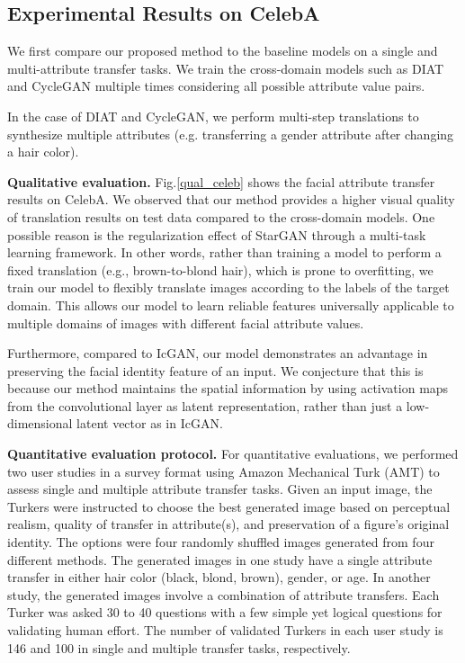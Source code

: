 \subsection{Experimental Results on CelebA} We first compare our proposed method to the baseline models on a single and multi-attribute transfer tasks. We train the cross-domain models such as DIAT and CycleGAN multiple times considering all possible attribute value pairs. 

In the case of DIAT and CycleGAN, we perform multi-step translations to synthesize multiple attributes (e.g. transferring a gender attribute after changing a hair color).
\medskip

\textbf{Qualitative evaluation.} Fig.\thinspace\ref{qual_celeb} shows the facial attribute transfer results on CelebA. We observed that our method provides a higher visual quality of translation results on test data compared to the cross-domain models. One possible reason is the regularization effect of StarGAN through a multi-task learning framework. In other words, rather than training a model to perform a fixed translation (e.g., brown-to-blond hair), which is prone to overfitting, we train our model to flexibly translate images according to the labels of the target domain. This allows our model to learn reliable features universally applicable to multiple domains of images with different facial attribute values. 

Furthermore, compared to IcGAN, our model demonstrates an advantage in preserving the facial identity feature of an input. We conjecture that this is because our method maintains the spatial information by using activation maps from the convolutional layer as latent representation, rather than just a low-dimensional latent vector as in IcGAN. 

\medskip

\textbf{Quantitative evaluation protocol.} For quantitative evaluations, we performed two user studies in a survey format using Amazon Mechanical Turk (AMT) to assess single and multiple attribute transfer tasks. Given an input image, the Turkers were instructed to choose the best generated image based on perceptual realism, quality of transfer in attribute(s), and preservation of a figure's original identity. The options were four randomly shuffled images generated from four different methods. The generated images in one study have a single attribute transfer in either hair color (black, blond, brown), gender, or age. In another study, the generated images involve a combination of attribute transfers. Each Turker was asked 30 to 40 questions with a few simple yet logical questions for validating human effort. The number of validated Turkers in each user study is 146 and 100 in single and multiple transfer tasks, respectively.
\medskip

